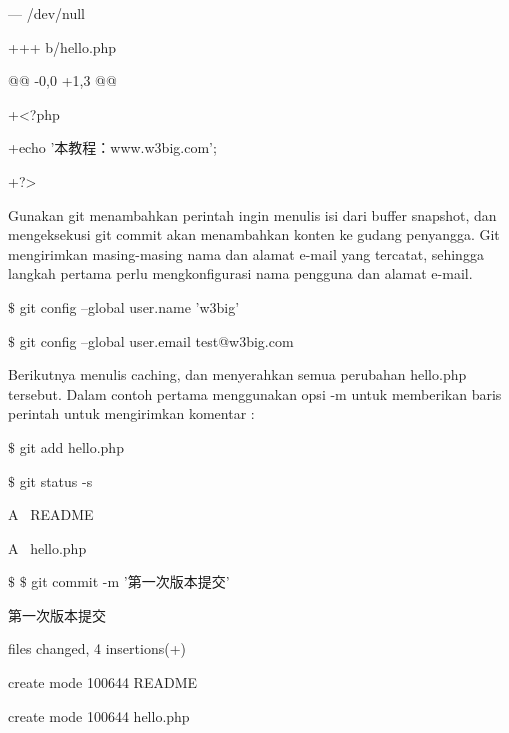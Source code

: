 \noindent 
{\fontsize{10pt}{10pt}\selectfont --- /dev/null} \par
\noindent 
{\fontsize{10pt}{10pt}\selectfont +++ b/hello.php} \par
\noindent 
{\fontsize{10pt}{10pt}\selectfont @@ -0,0 +1,3 @@} \par
\noindent 
{\fontsize{10pt}{10pt}\selectfont +<?php} \par
\noindent 
{\fontsize{10pt}{10pt}\selectfont +echo '本教程：www.w3big.com';} \par
\noindent 
{\fontsize{10pt}{10pt}\selectfont +?>} \par
\vspace{12pt}
\hspace*{0.5in} Gunakan git menambahkan perintah ingin menulis isi dari buffer snapshot, dan mengeksekusi git commit akan menambahkan konten ke gudang penyangga. Git mengirimkan masing-masing nama dan alamat e-mail yang tercatat, sehingga langkah pertama perlu mengkonfigurasi nama pengguna dan alamat e-mail.  \par
\noindent 
{\fontsize{10pt}{10pt}\selectfont  $  \$  $ git config --global user.name 'w3big'} \par
\noindent 
{\fontsize{10pt}{10pt}\selectfont  $  \$  $ git config --global user.email test@w3big.com} \par
\vspace{12pt}
\hspace*{0.5in} Berikutnya menulis caching, dan menyerahkan semua perubahan hello.php tersebut. Dalam contoh pertama menggunakan opsi -m untuk memberikan baris perintah untuk mengirimkan komentar : \par
\noindent 
{\fontsize{10pt}{10pt}\selectfont  $  \$  $ git add hello.php} \par
\noindent 
{\fontsize{10pt}{10pt}\selectfont  $  \$  $ git status -s} \par
\noindent 
{\fontsize{10pt}{10pt}\selectfont A~ README} \par
\noindent 
{\fontsize{10pt}{10pt}\selectfont A~ hello.php} \par
\noindent 
{\fontsize{10pt}{10pt}\selectfont  $  \$  $  $  \$  $ git commit -m '第一次版本提交'} \par
\noindent 
{\fontsize{10pt}{10pt} 第一次版本提交} \par
\noindent 
{\fontsize{10pt}{10pt} files changed, 4 insertions(+)} \par
\noindent 
{\fontsize{10pt}{10pt}\selectfont  create mode 100644 README} \par
\noindent 
{\fontsize{10pt}{10pt}\selectfont  create mode 100644 hello.php} \par
\noindent 
{\fontsize{10pt}{10pt}\selectfont  } \par

